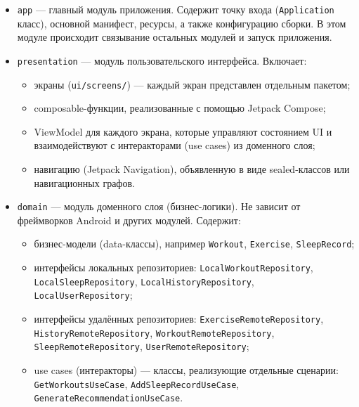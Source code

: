 \begin{itemize}
    \item \texttt{app} — главный модуль приложения. Содержит точку входа (\texttt{Application} класс), основной манифест, ресурсы, а также конфигурацию сборки. В этом модуле происходит связывание остальных модулей и запуск приложения.
    
    \item \texttt{presentation} — модуль пользовательского интерфейса. Включает:
        \begin{itemize}
            \item экраны (\texttt{ui/screens/}) — каждый экран представлен отдельным пакетом;
            \item composable-функции, реализованные с помощью Jetpack Compose;
            \item ViewModel для каждого экрана, которые управляют состоянием UI и взаимодействуют с интеракторами (use cases) из доменного слоя;
            \item навигацию (Jetpack Navigation), объявленную в виде sealed-классов или навигационных графов.
        \end{itemize}
    
    \item \texttt{domain} — модуль доменного слоя (бизнес-логики). Не зависит от фреймворков Android и других модулей. Содержит:
        \begin{itemize}
            \item бизнес-модели (data-классы), например \texttt{Workout}, \texttt{Exercise}, \texttt{SleepRecord};
            \item интерфейсы локальных репозиториев: \texttt{LocalWorkoutRepository}, \texttt{LocalSleepRepository}, \texttt{LocalHistoryRepository}, \texttt{LocalUserRepository};
            \item интерфейсы удалённых репозиториев: \texttt{ExerciseRemoteRepository}, \texttt{HistoryRemoteRepository}, \texttt{WorkoutRemoteRepository}, \texttt{SleepRemoteRepository}, \texttt{UserRemoteRepository};
            \item use cases (интеракторы) — классы, реализующие отдельные сценарии: \texttt{GetWorkoutsUseCase}, \texttt{AddSleepRecordUseCase}, \texttt{GenerateRecommendationUseCase}.
        \end{itemize}
    

\end{itemize}
